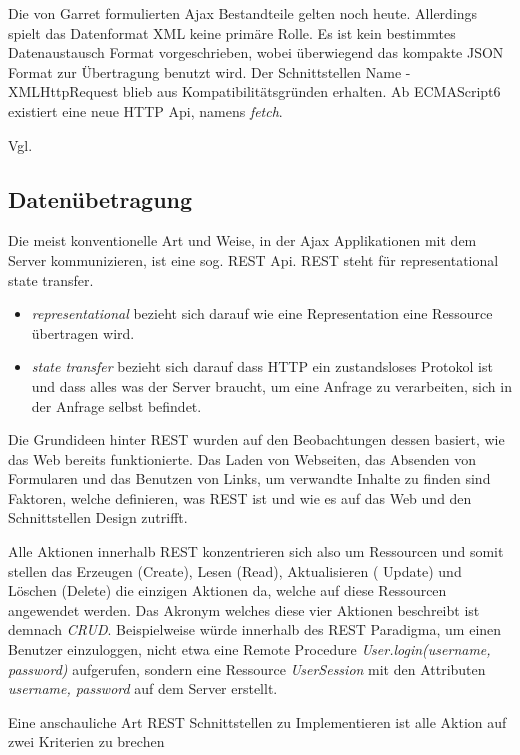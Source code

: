 Die von Garret formulierten Ajax Bestandteile gelten noch heute. Allerdings spielt das Datenformat XML keine primäre Rolle. Es ist kein bestimmtes Datenaustausch Format vorgeschrieben, wobei überwiegend das kompakte JSON Format zur Übertragung benutzt wird. Der Schnittstellen Name - XMLHttpRequest blieb aus Kompatibilitätsgründen erhalten. Ab ECMAScript6 existiert eine neue HTTP Api, namens \emph{fetch}.

Vgl. \cite{Garrett:2005}

\subsection{Datenübetragung}

Die meist konventionelle Art und Weise, in der Ajax Applikationen mit dem Server kommunizieren, ist eine sog. REST Api. REST steht für representational state transfer.    

\begin{itemize} 
\item \emph{representational} bezieht sich darauf wie eine Representation eine Ressource übertragen wird.
\item \emph{state transfer} bezieht sich darauf dass HTTP ein zustandsloses Protokol ist und dass alles was der Server braucht, um eine Anfrage zu verarbeiten, sich in der Anfrage selbst befindet.
\end{itemize}

Die Grundideen hinter REST wurden auf den Beobachtungen dessen basiert, wie das Web bereits funktionierte. Das Laden von Webseiten, das Absenden von Formularen und das Benutzen von Links, um verwandte Inhalte zu finden sind Faktoren, welche definieren, was REST ist und wie es auf das Web und den Schnittstellen Design zutrifft. 

Alle Aktionen innerhalb REST konzentrieren sich also um Ressourcen und somit stellen das Erzeugen (Create), Lesen (Read), Aktualisieren ( Update) und Löschen (Delete) die einzigen Aktionen da, welche auf diese Ressourcen angewendet werden. Das Akronym welches diese vier Aktionen beschreibt ist demnach \emph{CRUD}. Beispielweise würde innerhalb des REST Paradigma, um einen Benutzer einzuloggen, nicht etwa eine Remote Procedure \emph{User.login(username, password)} aufgerufen, sondern eine Ressource \emph{UserSession} mit den Attributen \emph{username, password} auf dem Server erstellt.

Eine anschauliche Art REST Schnittstellen zu Implementieren ist alle Aktion auf zwei Kriterien zu brechen 

